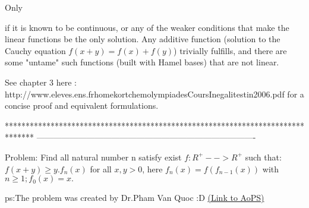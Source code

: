 \begin{solution}
	\begin{bolded}Only \end{bolded}if it is known to be continuous, or any of the weaker conditions that make the linear functions be the only solution. Any additive function (solution to the Cauchy equation $f(x+y) = f(x) + f(y)$) trivially fulfills, and there are some "untame" such functions (built with Hamel bases) that are not linear.
\end{solution}



\begin{solution}
	See chapter 3 here : http://www.eleves.ens.fr\/home\/kortchem\/olympiades\/Cours\/Inegalites\/tin2006.pdf for a concise proof and equivalent formulations.
\end{solution}
*******************************************************************************
-------------------------------------------------------------------------------

\begin{problem}
	Problem: Find all natural number n satisfy exist $f : R^{+} --> R^{+}$ such that:
$f(x+y) \geq y.f_{n}(x)$ for all $x,y > 0$, here $ f_{n}(x) = f(f_{n-1}(x))$ with $n \geq 1; f_{0}(x) = x.$

p\/s:The problem was created by Dr.Pham Van Quoc  :D
	\flushright \href{https://artofproblemsolving.com/community/c6h481138}{(Link to AoPS)}
\end{problem}




